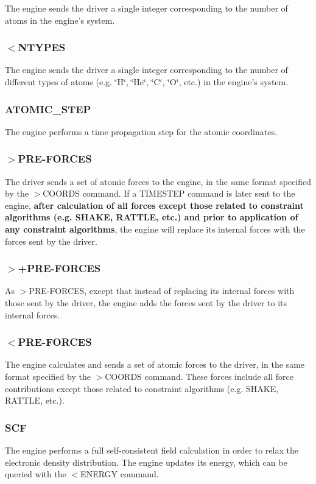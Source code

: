 The engine sends the driver a single integer corresponding to the number of atoms in the engine's system.\hypertarget{index_recv_types}{}\subsubsection{$<$\-N\-T\-Y\-P\-E\-S}\label{index_recv_types}
The engine sends the driver a single integer corresponding to the number of different types of atoms (e.\-g. \char`\"{}\-H\char`\"{}, \char`\"{}\-He\char`\"{}, \char`\"{}\-C\char`\"{}, \char`\"{}\-O\char`\"{}, etc.) in the engine's system.\hypertarget{index_atomic_step}{}\subsubsection{A\-T\-O\-M\-I\-C\-\_\-\-S\-T\-E\-P}\label{index_atomic_step}
The engine performs a time propagation step for the atomic coordinates.\hypertarget{index_send_preforces}{}\subsubsection{$>$\-P\-R\-E-\/\-F\-O\-R\-C\-E\-S}\label{index_send_preforces}
The driver sends a set of atomic forces to the engine, in the same format specified by the {\ttfamily $>$C\-O\-O\-R\-D\-S} command. If a {\ttfamily T\-I\-M\-E\-S\-T\-E\-P} command is later sent to the engine, {\bfseries  after calculation of all forces except those related to constraint algorithms (e.\-g. S\-H\-A\-K\-E, R\-A\-T\-T\-L\-E, etc.) and prior to application of any constraint algorithms}, the engine will replace its internal forces with the forces sent by the driver.\hypertarget{index_send_add_preforces}{}\subsubsection{$>$+\-P\-R\-E-\/\-F\-O\-R\-C\-E\-S}\label{index_send_add_preforces}
As {\ttfamily $>$P\-R\-E-\/\-F\-O\-R\-C\-E\-S}, except that instead of replacing its internal forces with those sent by the driver, the engine adds the forces sent by the driver to its internal forces.\hypertarget{index_recv_preforces}{}\subsubsection{$<$\-P\-R\-E-\/\-F\-O\-R\-C\-E\-S}\label{index_recv_preforces}
The engine calculates and sends a set of atomic forces to the driver, in the same format specified by the {\ttfamily $>$C\-O\-O\-R\-D\-S} command. These forces include all force contributions except those related to constraint algorithms (e.\-g. S\-H\-A\-K\-E, R\-A\-T\-T\-L\-E, etc.).\hypertarget{index_scf_command}{}\subsubsection{S\-C\-F}\label{index_scf_command}
The engine performs a full self-\/consistent field calculation in order to relax the electronic density distribution. The engine updates its energy, which can be queried with the {\ttfamily $<$E\-N\-E\-R\-G\-Y} command. 